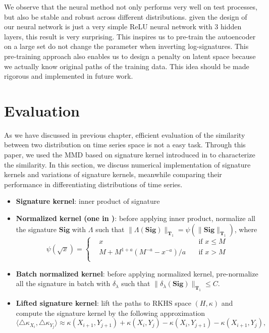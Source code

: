 \documentclass[12pt]{report}
\theoremstyle{definition}
\theoremstyle{remark}
\begin{document}
We observe that the neural method not only performs very well on test processes, but also be stable and robust across different distributions. given the design of our neural network is just a very simple ReLU neural network with 3 hidden layers, this result is very surprising. This inspires us to pre-train the autoencoder on a large set do not change the parameter when inverting log-signatures. This pre-training approach also enables us to design a penalty on latent space because we actually know original paths of the training data. This idea should be made rigorous and implemented in future work. 




\section{Evaluation}
As we have discussed in previous chapter, efficient evaluation of the similarity between two distribution on time series space is not a easy task. Through this paper, we used the MMD based on signature kernel introduced in \cite{chevyrev2018signature} to characterize the similarity. In this section, we discuss numerical implementation of signature kernels and variations of signature kernels, meanwhile comparing their performance in differentiating distributions of time series. 
\begin{itemize}
     \item \textbf{Signature kernel}: inner product of signature 
     \item \textbf{Normalized kernel (one in \cite{chevyrev2018signature})}: before applying inner product, normalize all the signature $\mathbf{Sig}$ with $\Lambda$ such that $\lVert \Lambda(\mathbf{Sig})\rVert_{\mathbf{T}_{1}} = \psi(\lVert \mathbf{Sig}\rVert_{\mathbf{T}_{1}})$, where 
     \begin{equation*}
       \psi(\sqrt{x}) = \left\{\begin{aligned}
         &x  &\text{if } x\leq M\\
         &M + M^{1+a}(M^{-a} - x^{-a})/a\quad &\text{if } x> M\\
       \end{aligned}\right.
     \end{equation*}
     \item \textbf{Batch normalized kernel}: before applying normalized kernel, pre-normalize all the signature in batch with $\delta_{\lambda}$ such that $\lVert \delta_{\lambda}(\mathbf{Sig})\rVert_{\mathbf{T}_{1}} \leq C$.
     \item \textbf{Lifted signature kernel}: lift the paths to RKHS space $(H,\kappa)$ and compute the signature kernel by the following approximation
     \begin{equation}\label{approkernel}
      \langle\triangle\kappa_{X_{i}}, \triangle\kappa_{Y_{j}}\rangle\approx\kappa(X_{i+1},Y_{j+1}) + \kappa(X_{i},Y_{j}) - \kappa(X_{i},Y_{j+1}) - \kappa(X_{i+1},Y_{j}),
    \end{equation}
\end{itemize}
\end{document}

